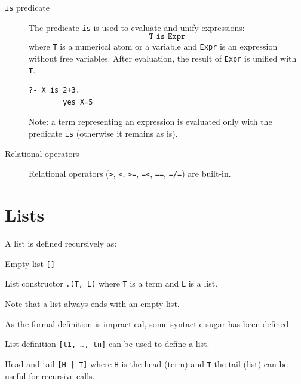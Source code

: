 \begin{description}
    \item[\texttt{is} predicate]
        The predicate \texttt{is} is used to evaluate and unify expressions:
        \[ \texttt{T is Expr} \]
        where \texttt{T} is a numerical atom or a variable and \texttt{Expr} is an expression without free variables.
        After evaluation, the result of \texttt{Expr} is unified with \texttt{T}.

        \begin{example} \phantom{}
            \begin{lstlisting}[language={}]
    ?- X is 2+3.
        yes X=5
            \end{lstlisting}
        \end{example}

        Note: a term representing an expression is evaluated only with the predicate \texttt{is} (otherwise it remains as is).

    \item[Relational operators]
        Relational operators (\texttt{>}, \texttt{<}, \texttt{>=}, \texttt{=<}, \texttt{==}, \texttt{=/=}) are built-in.
\end{description}



\section{Lists}

A list is defined recursively as:
\begin{descriptionlist}
    \item[Empty list] \texttt{[]}
    \item[List constructor] \texttt{.(T, L)} where \texttt{T} is a term and \texttt{L} is a list.
\end{descriptionlist}
Note that a list always ends with an empty list.

As the formal definition is impractical, some syntactic sugar has been defined:
\begin{descriptionlist}
    \item[List definition] \texttt{[t1, \dots, tn]} can be used to define a list.  
    \item[Head and tail] \texttt{[H | T]} where \texttt{H} is the head (term) and \texttt{T} the tail (list) can be useful for recursive calls.
\end{descriptionlist}



